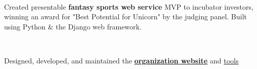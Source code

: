 \documentclass[]{hieudo-build}
\begin{document}
\begin{minipage}[t]{0.65\textwidth}
\\
\begin{tightemize}
\item Created presentable {\bf fantasy sports web service} MVP to
incubator investors, winning an award for "Best Potential for Unicorn"
by the judging panel. Built using Python \& the Django web framework.
\end{tightemize}
\sectionsep

\\
\begin{tightemize}
\item Designed, developed, and maintained the 
{\bf \href{https://www.skullhouse.nyc}{organization website}} and 
\href{https://github.com/JasonYao/Bobst-Room-Automator}{tools}
\end{tightemize}
\sectionsep




\end{minipage}
\end{document}
